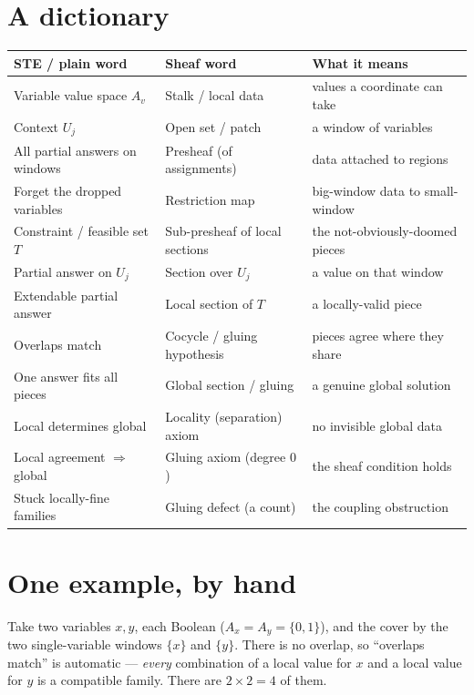 \documentclass[11pt]{article}
\begin{document}
\section{A dictionary}
\begin{center}
\small
\begin{tabular}{@{}lll@{}}
\toprule
\textbf{STE / plain word} & \textbf{Sheaf word} & \textbf{What it means}\\
\midrule
Variable value space $A_v$ & Stalk / local data & values a coordinate can take\\
Context $U_j$ & Open set / patch & a window of variables\\
All partial answers on windows & Presheaf (of assignments) & data attached to regions\\
Forget the dropped variables & Restriction map & big-window data to small-window\\
Constraint / feasible set $T$ & Sub-presheaf of local sections & the not-obviously-doomed pieces\\
Partial answer on $U_j$ & Section over $U_j$ & a value on that window\\
Extendable partial answer & Local section of $T$ & a locally-valid piece\\
Overlaps match & Cocycle / gluing hypothesis & pieces agree where they share\\
One answer fits all pieces & Global section / gluing & a genuine global solution\\
Local determines global & Locality (separation) axiom & no invisible global data\\
Local agreement $\Rightarrow$ global & Gluing axiom (degree $0$) & the sheaf condition holds\\
Stuck locally-fine families & Gluing defect (a count) & the coupling obstruction\\
\bottomrule
\end{tabular}
\end{center}

\section{One example, by hand}
Take two variables $x,y$, each Boolean ($A_x=A_y=\{0,1\}$), and the
cover by the two single-variable windows $\{x\}$ and $\{y\}$.  There is
no overlap, so ``overlaps match'' is automatic --- \emph{every}
combination of a local value for $x$ and a local value for $y$ is a
compatible family.  There are $2\times 2 = 4$ of them.
\end{document}
